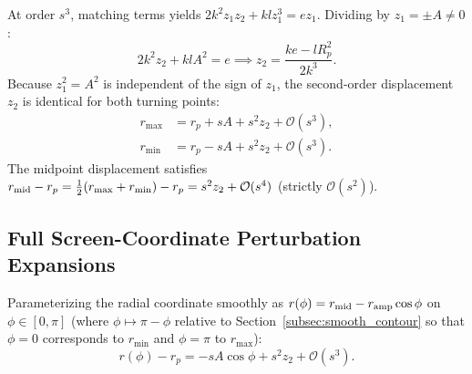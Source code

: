 At order $s^3$, matching terms yields $2k^2 z_1 z_2 + k l z_1^3 = e z_1$. Dividing by $z_1 = \pm A \neq 0$:
\begin{equation}
    2k^2 z_2 + k l A^2 = e \implies \boxed{z_2 = \frac{k e - l R_p^2}{2k^3}}.
    \label{eq:z2_exact_formula}
\end{equation}
Because $z_1^2 = A^2$ is independent of the sign of $z_1$, the second-order displacement $z_2$ is identical for both turning points:
\begin{align}
    r_{\max} &= r_p + s A + s^2 z_2 + \mathcal{O}(s^3), \label{eq:r_max_expansion} \\
    r_{\min} &= r_p - s A + s^2 z_2 + \mathcal{O}(s^3). \label{eq:r_min_expansion}
\end{align}
The midpoint displacement satisfies $r_{\rm mid} - r_p = \frac{1}{2}(r_{\max} + r_{\min}) - r_p = s^2 z_2 + \mathcal{O}(s^4)$ (strictly $\mathcal{O}(s^2)$).

\subsection{Full Screen-Coordinate Perturbation Expansions}
Parameterizing the radial coordinate smoothly as $r(\phi) = r_{\rm mid} - r_{\rm amp}\cos\phi$ on $\phi \in [0, \pi]$ (where $\phi \mapsto \pi - \phi$ relative to Section~\ref{subsec:smooth_contour} so that $\phi = 0$ corresponds to $r_{\min}$ and $\phi = \pi$ to $r_{\max}$):
\begin{equation}
    r(\phi) - r_p = -s A \cos\phi + s^2 z_2 + \mathcal{O}(s^3).
\end{equation}

